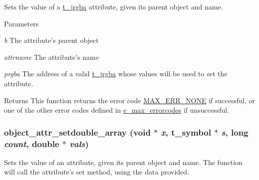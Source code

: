 Sets the value of a \hyperlink{structt__jrgba}{t\_\-jrgba} attribute, given its parent object and name. 
\begin{DoxyParams}{Parameters}
\item[{\em b}]The attribute's parent object \item[{\em attrname}]The attribute's name \item[{\em prgba}]The address of a valid \hyperlink{structt__jrgba}{t\_\-jrgba} whose values will be used to set the attribute.\end{DoxyParams}
\begin{DoxyReturn}{Returns}
This function returns the error code \hyperlink{group__misc_gga0764dd6c02b76cca7d053ae50555d69da6d22f77fef8b1e1b074cef5d29d935fd}{MAX\_\-ERR\_\-NONE} if successful, or one of the other error codes defined in \hyperlink{group__misc_ga0764dd6c02b76cca7d053ae50555d69d}{e\_\-max\_\-errorcodes} if unsuccessful. 
\end{DoxyReturn}
\hypertarget{group__attr_gabbce05b8e06b06e67de79a4809905810}{
\subsubsection[{object\_\-attr\_\-setdouble\_\-array}]{ object\_\-attr\_\-setdouble\_\-array (void $\ast$ {\em x}, \/  {\bf t\_\-symbol} $\ast$ {\em s}, \/  long {\em count}, \/  double $\ast$ {\em vals})}}
\label{group__attr_gabbce05b8e06b06e67de79a4809905810}


Sets the value of an attribute, given its parent object and name. The function will call the attribute's {\ttfamily set} method, using the data provided.


